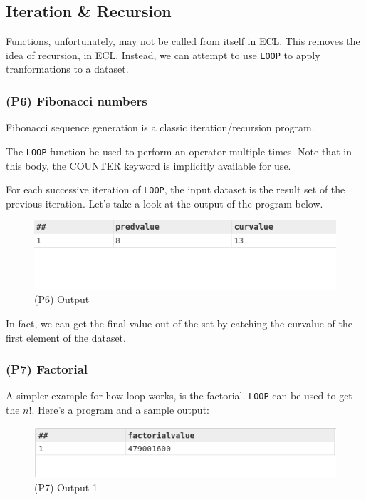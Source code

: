\documentclass[a4paper,oneside,12pt]{book}
\begin{document}
\subsection{Iteration \& Recursion}

Functions, unfortunately, may not be called from itself in ECL. This removes the idea of recursion, in ECL.
Instead, we can attempt to use \lstinline{LOOP} to apply tranformations to a dataset.


\subsubsection{(P6) Fibonacci numbers}

\noindent{}Fibonacci sequence generation is a classic iteration/recursion program.


The \lstinline!LOOP! function be used to perform an operator multiple times. Note that in this body, the COUNTER keyword is implicitly available for use.

For each successive iteration of \lstinline{LOOP}, the input dataset is the result set of the previous iteration. Let's take a look at the output of the program below.

\begin{figure}[h]
    \centering
    \includegraphics[width=.6\linewidth]{../output/43/op.png}
    \caption{(P6) Output}
\end{figure}

In fact, we can get the final value out of the set by catching the curvalue of the first element of the dataset.

\subsubsection{(P7) Factorial}

A simpler example for how loop works, is the factorial. \lstinline!LOOP! can be used to get the $n!$.
Here's a program and a sample output:



\begin{figure}[h]
    \centering
    \includegraphics[width=.6\linewidth]{../output/44/1.png}
    \caption{(P7) Output 1}
\end{figure}
\end{document}
